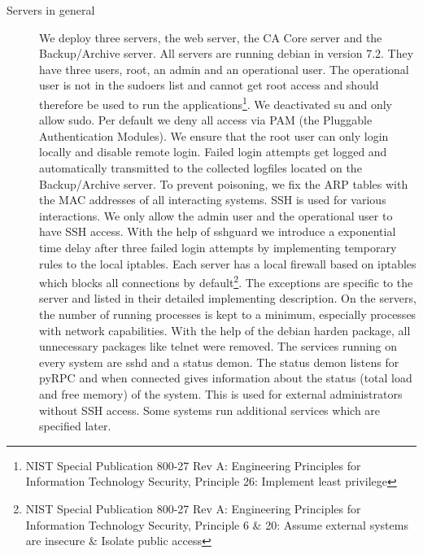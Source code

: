 \documentclass[a4paper, toc=index, 12pt, DIV14, twoside, BCOR2cm, headsepline, numbers=noenddot, bibliography=totoc]{report}
\begin{document}
\begin{description}
\item[Servers in general ] We deploy three servers, the web server, the CA Core server and the Backup/Archive server. All servers are running debian in version 7.2. They have three users, root, an admin and an operational user. The operational user is not in the sudoers list and cannot get root access and should therefore be used to run the applications\footnote{NIST Special Publication 800-27 Rev A: Engineering Principles for Information Technology Security, Principle 26: Implement least privilege}. We deactivated su and only allow sudo. Per default we deny all access via PAM (the Pluggable Authentication Modules). We ensure that the root user can only login locally and disable remote login. Failed login attempts get logged and automatically transmitted to the collected logfiles located on the Backup/Archive server. To prevent poisoning, we fix the ARP tables with the MAC addresses of all interacting systems. \newline
SSH is used for various interactions. We only allow the admin user and the operational user to have SSH access. With the help of sshguard we introduce a exponential time delay after three failed login attempts by implementing temporary rules to the local iptables.\newline
Each server has a local firewall based on iptables which blocks all connections by default\footnote{NIST Special Publication 800-27 Rev A: Engineering Principles for Information Technology Security, Principle 6 \& 20: Assume external systems are insecure \& Isolate public access}. The exceptions are specific to the server and listed in their detailed implementing description.\newline
On the servers, the number of running processes is kept to a minimum, especially processes with network capabilities. With the help of the debian harden package, all unnecessary packages like telnet were removed. The services running on every system are sshd and a status demon. The status demon listens for pyRPC and when connected gives information about the status (total load and free memory) of the system. This is used for external administrators without SSH access. Some systems run additional services which are specified later. 


\end{description}
\end{document}
